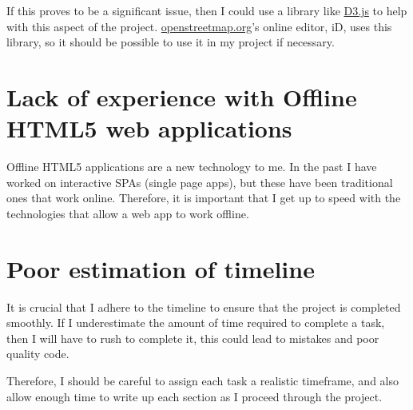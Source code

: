 \documentclass[]{final_report}
\begin{document}
If this proves to be a significant issue, then I could use a library like \href{https://github.com/d3/d3-geo}{D3.js} to help with this aspect of the project. \href{https://openstreetmap.org}{openstreetmap.org}'s online editor, iD, uses this library, so it should be possible to use it in my project if necessary. 

\section{Lack of experience with Offline HTML5 web applications}

Offline HTML5 applications are a new technology to me. In the past I have worked on interactive SPAs (single page apps), but these have been traditional ones that work online. Therefore, it is important that I get up to speed with the technologies that allow a web app to work offline.

\section{Poor estimation of timeline}

It is crucial that I adhere to the timeline to ensure that the project is completed smoothly. If I underestimate the amount of time required to complete a task, then I will have to rush to complete it, this could lead to mistakes and poor quality code.

Therefore, I should be careful to assign each task a realistic timeframe, and also allow enough time to write up each section as I proceed through the project.

\end{document}

